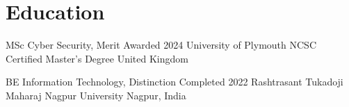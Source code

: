 \section{Education}
\cveducationdetail
  {MSc Cyber Security, Merit}
  {Awarded 2024}
  {University of Plymouth}
  {NCSC Certified Master's Degree}
  {United Kingdom}

\cveducationdetail
  {BE Information Technology, Distinction}
  {Completed 2022}
  {Rashtrasant Tukadoji Maharaj Nagpur University}
  {}
  {Nagpur, India}
